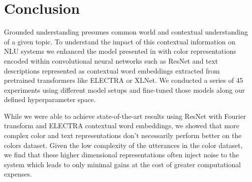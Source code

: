 \section{Conclusion}

Grounded understanding presumes common world and contextual understanding of a given topic. To understand the impact of this contextual information on NLU systems we enhanced the model presented in \citep{monroe-2017-colors} with color representations encoded within convolutional neural networks such as ResNet and text descriptions represented as contextual word embeddings extracted from pretrained transformers like ELECTRA or XLNet. We conducted a series of 45 experiments using different model setups and fine-tuned those models along our defined hyperparameter space.

\par
While we were able to achieve state-of-the-art results using ResNet with Fourier transform and ELECTRA contextual word embeddings, we showed that more complex color and text representations don’t necessarily perform better on the colors dataset. Given the low complexity of the utterances in the color dataset, we find that these higher dimensional representations often inject noise to the system which leads to only minimal gains at the cost of greater computational expenses.

